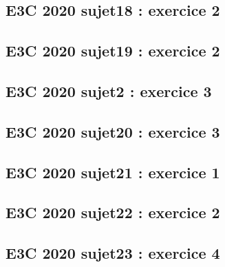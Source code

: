 \documentclass[lang=fr,edition=teacher,layout=sheet]{mxbook}
\begin{document}
\begingroup\endgroup
\par\bigskip
{}\subsection*{E3C 2020 sujet18 : exercice 2}
\begingroup\endgroup
\par\bigskip
{}\subsection*{E3C 2020 sujet19 : exercice 2}
\begingroup\endgroup
\par\bigskip
{}\subsection*{E3C 2020 sujet2 : exercice 3}
\begingroup\endgroup
\par\bigskip
{}\subsection*{E3C 2020 sujet20 : exercice 3}
\begingroup\endgroup
\par\bigskip
{}\subsection*{E3C 2020 sujet21 : exercice 1}
\begingroup\endgroup
\par\bigskip
{}\subsection*{E3C 2020 sujet22 : exercice 2}
\begingroup\endgroup
\par\bigskip
{}\subsection*{E3C 2020 sujet23 : exercice 4}
\begingroup\endgroup
\end{document}
